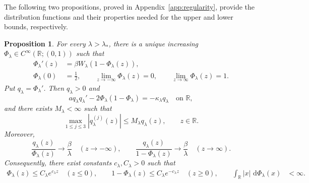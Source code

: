 \documentclass[12pt]{amsart}
\numberwithin{equation}{section}
\theoremstyle{plain}
\newtheorem{proposition}[theorem]{Proposition}
\theoremstyle{definition}
\newcommand{\dd}{\,\mathrm d}
\begin{document}
The following two propositions, proved in Appendix~\ref{app:regularity},
provide the distribution functions and their properties needed for the upper
and lower bounds, respectively.

\begin{proposition}
\label{prop:full-line-distribution}
For every $\lambda>\lambda_*$, there is a unique increasing
$\Phi_\lambda\in C^\infty(\mathbb R;(0,1))$ such that
\begin{equation}
\begin{aligned}
 \Phi_\lambda'(z)&=\beta W_\lambda(1-\Phi_\lambda(z)),\\
 \Phi_\lambda(0)&=\frac12,\qquad
 \lim_{z\to-\infty}\Phi_\lambda(z)=0, \qquad
 \lim_{z\to\infty}\Phi_\lambda(z)=1.
\end{aligned}
 \label{eq:Phi-phase-definition}
\end{equation}
Put $q_\lambda=\Phi_\lambda'$.  Then $q_\lambda>0$ and
\begin{equation}
 a q_\lambda q_\lambda'
 -2\Phi_\lambda(1-\Phi_\lambda)
 =-\kappa_\lambda q_\lambda
 \quad\text{on }\mathbb R,
 \label{eq:upper-profile-equation}
\end{equation}
and there exists $M_\lambda<\infty$ such that
\begin{equation}
 \max_{1\le j\le3}|q_\lambda^{(j)}(z)|
 \le M_\lambda q_\lambda(z),
 \qquad z\in\mathbb R.
 \label{eq:full-line-relative-bounds}
\end{equation}
Moreover,
\begin{equation}
 \frac{q_\lambda(z)}{\Phi_\lambda(z)}\longrightarrow\frac\beta\lambda
 \quad(z\to-\infty),
 \qquad
 \frac{q_\lambda(z)}{1-\Phi_\lambda(z)}\longrightarrow\frac\beta\lambda
 \quad(z\to\infty).
 \label{eq:full-line-tail-ratios}
\end{equation}
Consequently, there exist constants $c_\lambda,C_\lambda>0$ such that
\[
\begin{aligned}
 \Phi_\lambda(z)\le C_\lambda e^{c_\lambda z}
 \quad(z\le0),\qquad
 1-\Phi_\lambda(z)\le C_\lambda e^{-c_\lambda z}
 \quad(z\ge0),\qquad
 \int_{\mathbb R}|x|\,\dd\Phi_\lambda(x)&<\infty.
\end{aligned}
\]
\end{proposition}
\end{document}
